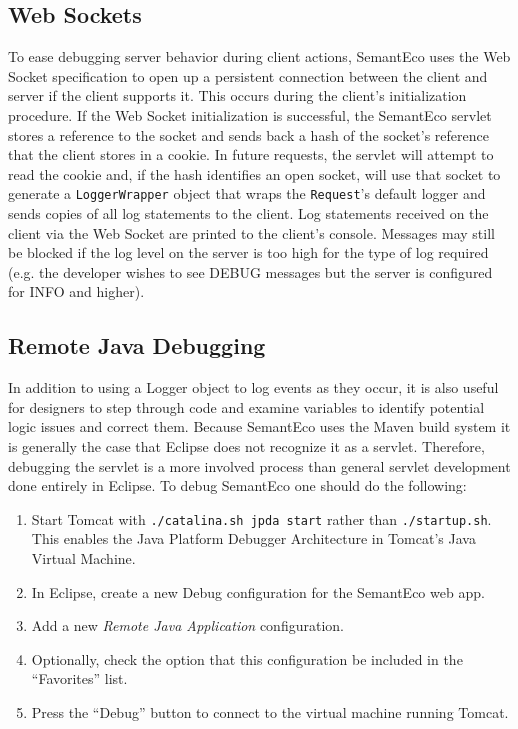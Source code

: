 \documentclass[letterpaper]{report}
\begin{document}
\subsection{Web Sockets}
To ease debugging server behavior during client actions, SemantEco uses the Web Socket specification to open up a persistent connection between the client and server if the client supports it. This occurs during the client's initialization procedure. If the Web Socket initialization is successful, the SemantEco servlet stores a reference to the socket and sends back a hash of the socket's reference that the client stores in a cookie. In future requests, the servlet will attempt to read the cookie and, if the hash identifies an open socket, will use that socket to generate a \texttt{LoggerWrapper} object that wraps the \texttt{Request}'s default logger and sends copies of all log statements to the client. Log statements received on the client via the Web Socket are printed to the client's console. Messages may still be blocked if the log level on the server is too high for the type of log required (e.g. the developer wishes to see DEBUG messages but the server is configured for INFO and higher).

\subsection{Remote Java Debugging}
In addition to using a Logger object to log events as they occur, it is also useful for designers to step through code and examine variables to identify potential logic issues and correct them. Because SemantEco uses the Maven build system it is generally the case that Eclipse does not recognize it as a servlet. Therefore, debugging the servlet is a more involved process than general servlet development done entirely in Eclipse. To debug SemantEco one should do the following:

\begin{enumerate}
\item Start Tomcat with \texttt{./catalina.sh jpda start} rather than \texttt{./startup.sh}. This enables the Java Platform Debugger Architecture in Tomcat's Java Virtual Machine.
\item In Eclipse, create a new Debug configuration for the SemantEco web app.
\item Add a new \textit{Remote Java Application} configuration.
\item Optionally, check the option that this configuration be included in the ``Favorites'' list.
\item Press the ``Debug'' button to connect to the virtual machine running Tomcat.
\end{enumerate}
\end{document}
